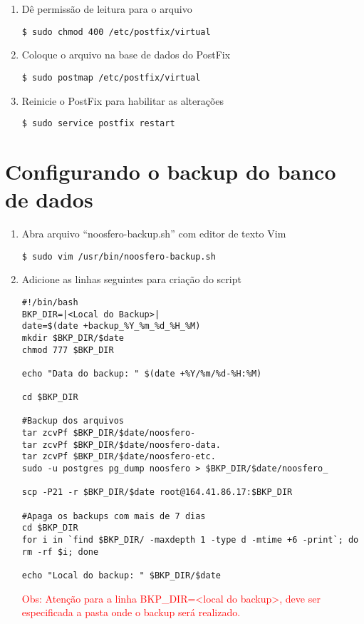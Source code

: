 \begin{enumerate}[label=\alph*)]
\item Dê permissão de leitura para o arquivo
\begin{lstlisting}
$ sudo chmod 400 /etc/postfix/virtual
\end{lstlisting}

\item Coloque o arquivo na base de dados do PostFix
\begin{lstlisting}
$ sudo postmap /etc/postfix/virtual
\end{lstlisting}

\item Reinicie o PostFix para habilitar as alterações
\begin{lstlisting}
$ sudo service postfix restart
\end{lstlisting}

\end{enumerate}

\section{Configurando o backup do banco de dados}

\begin{enumerate}[label=\alph*)]

\item Abra arquivo “noosfero-backup.sh” com editor de texto Vim
\begin{lstlisting}
$ sudo vim /usr/bin/noosfero-backup.sh
\end{lstlisting}

\item Adicione as linhas seguintes para criação do script
\begin{lstlisting}[style=base]
#!/bin/bash
BKP_DIR=|<Local do Backup>|
date=$(date +backup_%Y_%m_%d_%H_%M)
mkdir $BKP_DIR/$date
chmod 777 $BKP_DIR

echo "Data do backup: " $(date +%Y/%m/%d-%H:%M)

cd $BKP_DIR

#Backup dos arquivos
tar zcvPf $BKP_DIR/$date/noosfero-
tar zcvPf $BKP_DIR/$date/noosfero-data.
tar zcvPf $BKP_DIR/$date/noosfero-etc.
sudo -u postgres pg_dump noosfero > $BKP_DIR/$date/noosfero_

scp -P21 -r $BKP_DIR/$date root@164.41.86.17:$BKP_DIR

#Apaga os backups com mais de 7 dias
cd $BKP_DIR
for i in `find $BKP_DIR/ -maxdepth 1 -type d -mtime +6 -print`; do rm -rf $i; done

echo "Local do backup: " $BKP_DIR/$date
\end{lstlisting}

\textcolor{red}{{\scriptsize Obs: Atenção para a linha  BKP\_DIR=<local do backup>, deve ser especificada a pasta onde o backup será realizado.}}

\end{enumerate}

